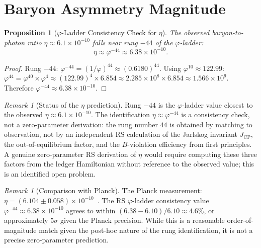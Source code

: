 \documentclass[12pt,a4paper]{article}
\newtheorem{proposition}[theorem]{Proposition}
\theoremstyle{definition}
\theoremstyle{remark}
\newtheorem{remark}[theorem]{Remark}
\begin{document}
\section{Baryon Asymmetry Magnitude}
\label{sec:magnitude}

\begin{proposition}[$\varphi$-Ladder Consistency Check for $\eta$]
\label{thm:eta}
The observed baryon-to-photon ratio $\eta \approx 6.1 \times 10^{-10}$
falls near rung $-44$ of the $\varphi$-ladder:
\begin{equation}
  \boxed{\eta \approx \varphi^{-44} \approx 6.38 \times 10^{-10}.}
\end{equation}
\end{proposition}

\begin{proof}
Rung $-44$: $\varphi^{-44} = (1/\varphi)^{44} \approx (0.6180)^{44}$.
Using $\varphi^{10} \approx 122.99$:
$\varphi^{44} = \varphi^{40} \times \varphi^{4} \approx (122.99)^4 \times 6.854
\approx 2.285 \times 10^8 \times 6.854 \approx 1.566 \times 10^9$.
Therefore $\varphi^{-44} \approx 6.38 \times 10^{-10}$.
\end{proof}

\begin{remark}[Status of the $\eta$ prediction]
\label{rem:eta-status}
Rung $-44$ is the $\varphi$-ladder value closest to the observed
$\eta \approx 6.1 \times 10^{-10}$.  The identification $\eta \approx
\varphi^{-44}$ is a consistency check, not a zero-parameter derivation:
the rung number $44$ is obtained by matching to observation, not by
an independent RS calculation of the Jarlskog invariant
$J_{\mathrm{CP}}$, the out-of-equilibrium factor, and the $B$-violation
efficiency from first principles.  A genuine zero-parameter RS
derivation of $\eta$ would require computing these three factors from
the ledger Hamiltonian without reference to the observed value; this
is an identified open problem.
\end{remark}

\begin{remark}[Comparison with Planck]
The Planck measurement:
$\eta = (6.104 \pm 0.058) \times 10^{-10}$~\cite{Planck2020}.
The RS $\varphi$-ladder consistency value $\varphi^{-44} \approx
6.38 \times 10^{-10}$ agrees to within
$(6.38 - 6.10)/6.10 \approx 4.6\%$, or approximately $5\sigma$
given the Planck precision.  While this is a reasonable order-of-magnitude
match given the post-hoc nature of the rung identification, it is
not a precise zero-parameter prediction.
\end{remark}
\end{document}
